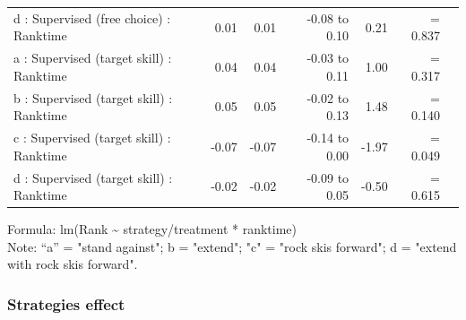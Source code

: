 \documentclass[pdflatex,sn-mathphys-num]{sn-jnl}%
\theoremstyle{thmstyleone}%
\theoremstyle{thmstyletwo}%
\theoremstyle{thmstylethree}%
\begin{document}
\begin{appendices}
\begin{longtable}{lrrrrrl}
d : Supervised (free choice) : Ranktime & 0.01 & 0.01 & -0.08 to 0.10 & 0.21 &  =  0.837 \\ 
a : Supervised (target skill) : Ranktime & 0.04 & 0.04 & -0.03 to 0.11 & 1.00 &  =  0.317 \\ 
b : Supervised (target skill) : Ranktime & 0.05 & 0.05 & -0.02 to 0.13 & 1.48 &  =  0.140 \\ 
c : Supervised (target skill) : Ranktime & -0.07 & -0.07 & -0.14 to 0.00 & -1.97 &  =  0.049 \\ 
d : Supervised (target skill) : Ranktime & -0.02 & -0.02 & -0.09 to 0.05 & -0.50 &  =  0.615 \\ 
\bottomrule
\end{longtable}
\begin{minipage}{\linewidth}
Formula: lm(Rank \textasciitilde{} strategy/treatment * ranktime)\\
Note: “a” = "stand against"; b = "extend"; "c" = "rock skis forward"; d = "extend with rock skis forward". 
\end{minipage}
\clearpage

\subsubsection{Strategies effect}


\end{appendices}
\end{document}
